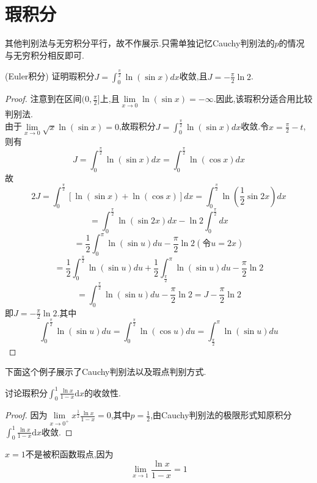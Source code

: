 \chapter{瑕积分}

其他判别法与无穷积分平行，故不作展示.只需单独记忆Cauchy判别法的$p$的情况与无穷积分相反即可.

\begin{example}
	(Euler积分) 证明瑕积分$
		J=\int_0^{\frac{\pi}{2}}{\ln \left( \sin x \right) dx}
	$收敛,且$
		J=-\frac{\pi}{2}\ln 2
	$.
\end{example}

\begin{proof}
	注意到在区间$(0,\frac{\pi}{2}]$上,且$
		\lim\limits_{x\rightarrow 0}\ln \left( \sin x \right) =-\infty
	$.因此,该瑕积分适合用比较判别法.\\由于$
		\lim\limits_{x\rightarrow 0}\sqrt{x}\ln \left( \sin x \right) =0
	$,故瑕积分$
		J=\int_0^{\frac{\pi}{2}}{\ln \left( \sin x \right) dx}
	$收敛.令$x=\frac{\pi}{2}-t$,则有
	$$
		J=\int_0^{\frac{\pi}{2}}{\ln \left( \sin x \right) dx}=\int_0^{\frac{\pi}{2}}{\ln \left( \cos x \right) dx}
	$$
	故
	$$
		2J=\int_0^{\frac{\pi}{2}}{\left[ \ln \left( \sin x \right) +\ln \left( \cos x \right) \right] dx}=\int_0^{\frac{\pi}{2}}{\ln \left( \frac{1}{2}\sin 2x \right) dx}
	$$
	$$
		=\int_0^{\frac{\pi}{2}}{\ln \left( \sin 2x \right) dx}-\ln 2\int_0^{\frac{\pi}{2}}{dx}
	$$
	$$
		=\frac{1}{2}\int_0^{\pi}{\ln \left( \sin u \right) du}-\frac{\pi}{2}\ln 2\left( \text{令}u=2x \right)
	$$
	$$
		=\frac{1}{2}\int_0^{\frac{\pi}{2}}{\ln \left( \sin u \right) du}+\frac{1}{2}\int_{\frac{\pi}{2}}^{\pi}{\ln \left( \sin u \right) du}-\frac{\pi}{2}\ln 2
	$$
	$$
		=\int_0^{\frac{\pi}{2}}{\ln \left( \sin u \right) du}-\frac{\pi}{2}\ln 2=J-\frac{\pi}{2}\ln 2
	$$
	即$
		J=-\frac{\pi}{2}\ln 2
	$.其中$$
		\int_0^{\frac{\pi}{2}}{\ln \left( \sin u \right) du}=\int_0^{\frac{\pi}{2}}{\ln \left( \cos u \right) du}=\int_{\frac{\pi}{2}}^{\pi}{\ln \left( \sin u \right) du}
	$$
\end{proof}

下面这个例子展示了Cauchy判别法以及瑕点判别方式.

\begin{example}
	讨论瑕积分$
		\int_0^1{\frac{\ln x}{1-x}\text{d}x}
	$的收敛性.
\end{example}

\begin{proof}
	因为$
		\lim\limits_{x\rightarrow 0^+}x^{\frac{1}{2}}\frac{\ln x}{1-x}=0
	$,其中$p=\frac{1}{2}$,由Cauchy判别法的极限形式知原积分$
		\int_0^1{\frac{\ln x}{1-x}\text{d}x}
	$收敛.
\end{proof}

\begin{note}
	$x=1$不是被积函数瑕点,因为
	$$
		\lim_{x\rightarrow 1}\frac{\ln x}{1-x}=1
	$$
\end{note}
